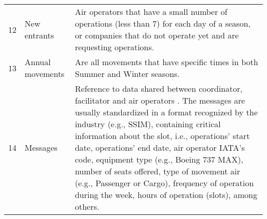 \begin{center}
\begin{xltabular}{\textwidth}{p{0.5cm} p{4cm} p{10cm}}
12 & New entrants & Air operators that have a small number of operations (less than 7) for each day of a season, or companies that do not operate yet and are requesting operations. \\
13 & Annual movements & Are all movements that have specific times in both Summer and Winter seasons. \\
14 & Messages & Reference to data shared between coordinator, facilitator and air operators \cite{SSIM2020}. The messages are usually standardized in a format recognized by the industry (e.g., SSIM), containing critical information about the slot, i.e., operations' start date, operations' end date, air operator IATA's code, equipment type (e.g., Boeing 737 MAX), number of seats offered, type of movement air (e.g., Passenger or Cargo), frequency of operation during the week, hours of operation (slots), among others.\\ \hline
\end{xltabular}

\end{center}